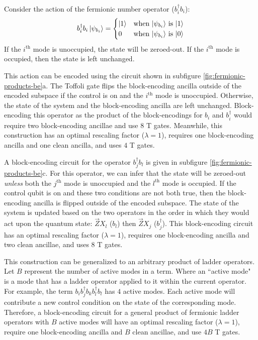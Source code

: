 Consider the action of the fermionic number operator ($b_i^\dagger b_i$):
\begin{equation}
    \begin{split}
        b_i^\dagger b_i \ket{\psi_{b_i}} = \begin{cases} 
            \ket{1} & \text{when $\ket{\psi_{b_i}}$ is $\ket{1}$} \\
            0 & \text{when $\ket{\psi_{b_i}}$ is $\ket{0}$} \\
                                        \end{cases}
    \end{split}
\end{equation}
If the $i^\text{th}$ mode is unoccupied, the state will be zeroed-out.
If the $i^\text{th}$ mode is occupied, then the state is left unchanged.

This action can be encoded using the circuit shown in subfigure \ref{fig:fermionic-products-be}a.
The Toffoli gate flips the block-encoding ancilla outside of the encoded subspace if the control is on and the $i^\text{th}$ mode is unoccupied.
Otherwise, the state of the system and the block-encoding ancilla are left unchanged.
Block-encoding this operator as the product of the block-encodings for $b_i$ and $b_i^\dagger$ would require two block-encoding ancillae and use $8$ T gates.
Meanwhile, this construction has an optimal rescaling factor ($\lambda = 1$), requires one block-encoding ancilla and one clean ancilla, and uses $4$ T gates.

A block-encoding circuit for the operator $b_j^\dagger b_l$ is given in subfigure \ref{fig:fermionic-products-be}c.
For this operator, we can infer that the state will be zeroed-out \textit{unless} both the $j^\text{th}$ mode is unoccupied and the $l^\text{th}$ mode is occupied.
If the control qubit is on and these two conditions are not both true, then the block-encoding ancilla is flipped outside of the encoded subspace.
The state of the system is updated based on the two operators in the order in which they would act upon the quantum state: $\vec{Z}X_l$ ($b_l$) then $\vec{Z}X_j$ ($b_j^\dagger$).
This block-encoding circuit has an optimal rescaling factor ($\lambda = 1$), requires one block-encoding ancilla and two clean ancillae, and uses $8$ T gates.


This construction can be generalized to an arbitrary product of ladder operators.
Let $B$ represent the number of active modes in a term.
Where an ``active mode" is a mode that has a ladder operator applied to it within the current operator.
For example, the term $b_i b_j^\dagger b_k b_l^\dagger b_l$ has $4$ active modes.
Each active mode will contribute a new control condition on the state of the corresponding mode.
Therefore, a block-encoding circuit for a general product of fermionic ladder operators with $B$ active modes will have an optimal rescaling factor ($\lambda = 1$), require one block-encoding ancilla and $B$ clean ancillae, and use $4B$ T gates.

